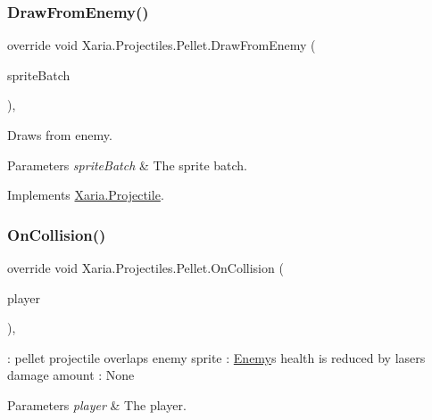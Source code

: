 \subsubsection{\texorpdfstring{Draw\+From\+Enemy()}{DrawFromEnemy()}}
{\footnotesize\ttfamily override void Xaria.\+Projectiles.\+Pellet.\+Draw\+From\+Enemy (\begin{DoxyParamCaption}\item[{ref Sprite\+Batch}]{sprite\+Batch }\end{DoxyParamCaption})\hspace{0.3cm}{\ttfamily [inline]}, {\ttfamily [virtual]}}



Draws from enemy. 


\begin{DoxyParams}{Parameters}
{\em sprite\+Batch} & The sprite batch.\\
\hline
\end{DoxyParams}


Implements \hyperlink{classXaria_1_1Projectile_a92b00c404863fc5ef875fb598345bcbc}{Xaria.\+Projectile}.

\mbox{\label{classXaria_1_1Projectiles_1_1Pellet_a2491ac1fdf3e4ea69354e1624d7ff690}} 
\subsubsection{\texorpdfstring{On\+Collision()}{OnCollision()}\hspace{0.1cm}{\footnotesize\ttfamily [1/2]}}
{\footnotesize\ttfamily override void Xaria.\+Projectiles.\+Pellet.\+On\+Collision (\begin{DoxyParamCaption}\item[{ref \hyperlink{classXaria_1_1Player}{Player}}]{player }\end{DoxyParamCaption})\hspace{0.3cm}{\ttfamily [inline]}, {\ttfamily [virtual]}}



\+: pellet projectile overlaps enemy sprite \+: \hyperlink{classXaria_1_1Enemy}{Enemy}\textquotesingle{}s health is reduced by laser\textquotesingle{}s damage amount \+: None 


\begin{DoxyParams}{Parameters}
{\em player} & The player.\\
\hline
\end{DoxyParams}



